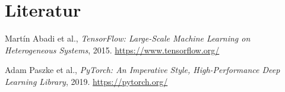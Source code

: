 \documentclass[a4paper, 11pt]{scrartcl}
\begin{document}
\section*{Literatur}
\begin{thebibliography}{99}

Martín Abadi et al., \emph{TensorFlow: Large-Scale Machine Learning on Heterogeneous Systems}, 2015.  
\url{https://www.tensorflow.org/}

Adam Paszke et al., \emph{PyTorch: An Imperative Style, High-Performance Deep Learning Library}, 2019.  
\url{https://pytorch.org/}

\end{thebibliography}
\end{document}
